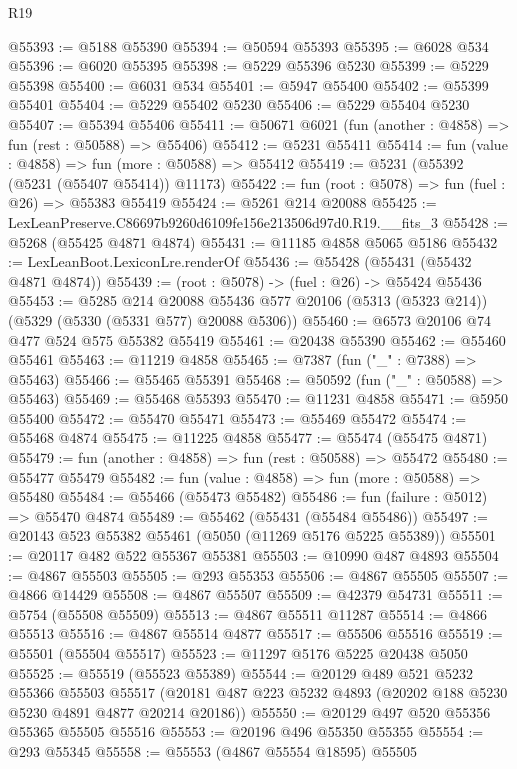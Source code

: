 \begin{lexlean}{R19}
\begin{coremodule}
@55393 := @5188 @55390
@55394 := @50594 @55393
@55395 := @6028 @534
@55396 := @6020 @55395
@55398 := @5229 @55396 @5230
@55399 := @5229 @55398
@55400 := @6031 @534
@55401 := @5947 @55400
@55402 := @55399 @55401
@55404 := @5229 @55402 @5230
@55406 := @5229 @55404 @5230
@55407 := @55394 @55406
@55411 := @50671 @6021 (fun (another : @4858) => fun (rest : @50588) => @55406)
@55412 := @5231 @55411
@55414 := fun (value : @4858) => fun (more : @50588) => @55412
@55419 := @5231 (@55392 (@5231 (@55407 @55414)) @11173)
@55422 := fun (root : @5078) => fun (fuel : @26) => @55383 @55419
@55424 := @5261 @214 @20088
@55425 := LexLeanPreserve.C86697b9260d6109fe156e213506d97d0.R19.__fits_3
@55428 := @5268 (@55425 @4871 @4874)
@55431 := @11185 @4858 @5065 @5186
@55432 := LexLeanBoot.LexiconLre.renderOf
@55436 := @55428 (@55431 (@55432 @4871 @4874))
@55439 := (root : @5078) -> (fuel : @26) -> @55424 @55436
@55453 := @5285
    @214
    @20088
    @55436
    @577
    @20106
    (@5313 (@5323 @214))
    (@5329 (@5330 (@5331 @577) @20088 @5306))
@55460 := @6573 @20106 @74 @477 @524 @575 @55382 @55419
@55461 := @20438 @55390
@55462 := @55460 @55461
@55463 := @11219 @4858
@55465 := @7387 (fun ("_" : @7388) => @55463)
@55466 := @55465 @55391
@55468 := @50592 (fun ("_" : @50588) => @55463)
@55469 := @55468 @55393
@55470 := @11231 @4858
@55471 := @5950 @55400
@55472 := @55470 @55471
@55473 := @55469 @55472
@55474 := @55468 @4874
@55475 := @11225 @4858
@55477 := @55474 (@55475 @4871)
@55479 := fun (another : @4858) => fun (rest : @50588) => @55472
@55480 := @55477 @55479
@55482 := fun (value : @4858) => fun (more : @50588) => @55480
@55484 := @55466 (@55473 @55482)
@55486 := fun (failure : @5012) => @55470 @4874
@55489 := @55462 (@55431 (@55484 @55486))
@55497 := @20143 @523 @55382 @55461 (@5050 (@11269 @5176 @5225 @55389))
@55501 := @20117 @482 @522 @55367 @55381
@55503 := @10990 @487 @4893
@55504 := @4867 @55503
@55505 := @293 @55353
@55506 := @4867 @55505
@55507 := @4866 @14429
@55508 := @4867 @55507
@55509 := @42379 @54731
@55511 := @5754 (@55508 @55509)
@55513 := @4867 @55511 @11287
@55514 := @4866 @55513
@55516 := @4867 @55514 @4877
@55517 := @55506 @55516
@55519 := @55501 (@55504 @55517)
@55523 := @11297 @5176 @5225 @20438 @5050
@55525 := @55519 (@55523 @55389)
@55544 := @20129
    @489
    @521
    @5232
    @55366
    @55503
    @55517
    (@20181 @487 @223 @5232 @4893 (@20202 @188 @5230 @5230 @4891 @4877 @20214 @20186))
@55550 := @20129 @497 @520 @55356 @55365 @55505 @55516
@55553 := @20196 @496 @55350 @55355
@55554 := @293 @55345
@55558 := @55553 (@4867 @55554 @18595) @55505

\end{coremodule}
\end{lexlean}
